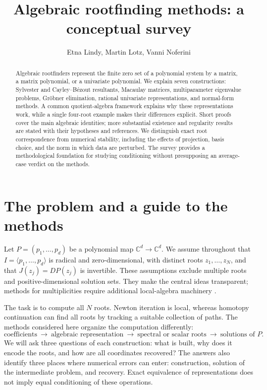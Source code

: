 \documentclass[12pt]{article}
\title{Algebraic rootfinding methods: a conceptual survey}
\author{Etna Lindy, Martin Lotz, Vanni Noferini}
\date{}
\def\C{\mathbb{C}}
\theoremstyle{definition}
\theoremstyle{remark}
\begin{document}
\maketitle

\begin{abstract}
Algebraic rootfinders represent the finite zero set of a polynomial system by a matrix,
a matrix polynomial, or a univariate polynomial. We explain seven constructions:
Sylvester and Cayley--B\'ezout resultants, Macaulay matrices, multiparameter eigenvalue
problems, Gr\"obner elimination, rational univariate representations, and normal-form
methods. A common quotient-algebra framework explains why these representations work,
while a single four-root example makes their differences explicit. Short proofs cover
the main algebraic identities; more substantial existence and regularity results are
stated with their hypotheses and references. We distinguish exact root correspondence
from numerical stability, including the effects of projection, basis choice, and the
norm in which data are perturbed. The survey provides a methodological foundation for
studying conditioning without presupposing an average-case verdict on the methods.
\end{abstract}

\section{The problem and a guide to the methods}\label{sec:intro}

Let $P=(p_1,\ldots,p_d)$ be a polynomial map $\C^d\to\C^d$. We assume throughout that
$I=\langle p_1,\ldots,p_d\rangle$ is radical and zero-dimensional, with distinct roots
$z_1,\ldots,z_N$, and that $J(z_j)=DP(z_j)$ is invertible. These assumptions exclude
multiple roots and positive-dimensional solution sets. They make the central ideas
transparent; methods for multiplicities require additional local-algebra machinery
\cite{moller1995multivariate,stetter2004numerical}.

The task is to compute all $N$ roots. Newton iteration is local, whereas homotopy
continuation can find all roots by tracking a suitable collection of paths.
The methods considered here organize the computation differently:
\[
\text{coefficients}\ \longrightarrow\ \text{algebraic representation}
\ \longrightarrow\ \text{spectral or scalar roots}
\ \longrightarrow\ \text{solutions of }P.
\]
We will ask three questions of each construction: what is built, why does it encode
the roots, and how are all coordinates recovered? The answers also identify three
places where numerical errors can enter: construction, solution of the intermediate
problem, and recovery. Exact equivalence of representations does not imply equal
conditioning of these operations.
\end{document}
